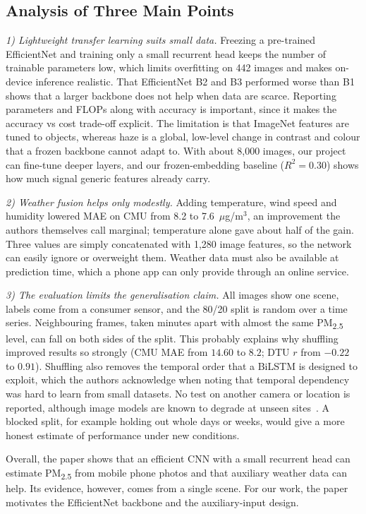 \documentclass[conference]{IEEEtran}
\newcommand{\pmtwofive}{PM\textsubscript{2.5}}
\begin{document}
\subsection{Analysis of Three Main Points}
\textit{1) Lightweight transfer learning suits small data.} Freezing a pre-trained EfficientNet and training only a small recurrent head keeps the number of trainable parameters low, which limits overfitting on 442 images and makes on-device inference realistic. That EfficientNet B2 and B3 performed worse than B1 shows that a larger backbone does not help when data are scarce. Reporting parameters and FLOPs along with accuracy is important, since it makes the accuracy vs cost trade-off explicit. The limitation is that ImageNet features are tuned to objects, whereas haze is a global, low-level change in contrast and colour that a frozen backbone cannot adapt to. With about 8,000 images, our project can fine-tune deeper layers, and our frozen-embedding baseline ($R^2=0.30$) shows how much signal generic features already carry.

\textit{2) Weather fusion helps only modestly.} Adding temperature, wind speed and humidity lowered MAE on CMU from 8.2 to 7.6~$\mu$g/m$^3$, an improvement the authors themselves call marginal; temperature alone gave about half of the gain. Three values are simply concatenated with 1,280 image features, so the network can easily ignore or overweight them. Weather data must also be available at prediction time, which a phone app can only provide through an online service.

\textit{3) The evaluation limits the generalisation claim.} All images show one scene, labels come from a consumer sensor, and the 80/20 split is random over a time series. Neighbouring frames, taken minutes apart with almost the same \pmtwofive{} level, can fall on both sides of the split. This probably explains why shuffling improved results so strongly (CMU MAE from $14.60$ to $8.2$; DTU $r$ from $-0.22$ to $0.91$). Shuffling also removes the temporal order that a BiLSTM is designed to exploit, which the authors acknowledge when noting that temporal dependency was hard to learn from small datasets. No test on another camera or location is reported, although image models are known to degrade at unseen sites~\cite{byler2025}. A blocked split, for example holding out whole days or weeks, would give a more honest estimate of performance under new conditions.

Overall, the paper shows that an efficient CNN with a small recurrent head can estimate \pmtwofive{} from mobile phone photos and that auxiliary weather data can help. Its evidence, however, comes from a single scene. For our work, the paper motivates the EfficientNet backbone and the auxiliary-input design.
\end{document}

